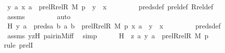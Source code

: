 \begin{isabellebody}
\ {\isachardoublequoteopen}{\isacharless}{\kern0pt}{\isacharless}{\kern0pt}y{\isacharcomma}{\kern0pt}\ a{\isachargreater}{\kern0pt}{\isacharcomma}{\kern0pt}\ {\isacharless}{\kern0pt}x{\isacharcomma}{\kern0pt}\ a{\isachargreater}{\kern0pt}{\isachargreater}{\kern0pt}\ {\isasymin}\ prel{\isacharparenleft}{\kern0pt}Rrel{\isacharparenleft}{\kern0pt}R{\isacharcomma}{\kern0pt}\ M{\isacharparenright}{\kern0pt}{\isacharcomma}{\kern0pt}\ p{\isacharparenright}{\kern0pt}\ {\isasymor}\ y\ {\isacharequal}{\kern0pt}\ x{\isachardoublequoteclose}\ \isanewline
\ \ \ \ \ \ \isamarkupfalse%
\ preds{\isacharunderscore}{\kern0pt}def\ prel{\isacharunderscore}{\kern0pt}def\ Rrel{\isacharunderscore}{\kern0pt}def\isanewline
\ \ \ \ \ \ \isamarkupfalse%
\ assms\ \isanewline
\ \ \ \ \ \ \isamarkupfalse%
\ auto\isanewline
\ \ \ \ \isamarkupfalse%
\ \isamarkupfalse%
\ H{}{\isacharcolon}{\kern0pt}\ {\isachardoublequoteopen}{\isacharless}{\kern0pt}y{\isacharcomma}{\kern0pt}\ a{\isachargreater}{\kern0pt}\ {\isasymin}\ preds{\isacharparenleft}{\kern0pt}{\isasymlambda}a\ b{\isachardot}{\kern0pt}\ {\isasymlangle}a{\isacharcomma}{\kern0pt}\ b{\isasymrangle}\ {\isasymin}\ prel{\isacharparenleft}{\kern0pt}Rrel{\isacharparenleft}{\kern0pt}R{\isacharcomma}{\kern0pt}\ M{\isacharparenright}{\kern0pt}{\isacharcomma}{\kern0pt}\ p{\isacharparenright}{\kern0pt}{\isacharcomma}{\kern0pt}\ {\isasymlangle}x{\isacharcomma}{\kern0pt}\ a{\isasymrangle}{\isacharparenright}{\kern0pt}\ {\isasymor}\ y\ {\isacharequal}{\kern0pt}\ x{\isachardoublequoteclose}\ \isanewline
\ \ \ \ \ \ \isamarkupfalse%
\ preds{\isacharunderscore}{\kern0pt}def\ \isamarkupfalse%
\ assms\ yzH\ pair{\isacharunderscore}{\kern0pt}in{\isacharunderscore}{\kern0pt}M{\isacharunderscore}{\kern0pt}iff\ \isamarkupfalse%
\ simp\isanewline
\isanewline
\ \ \ \ \isamarkupfalse%
\ H{}\ {\isacharcolon}{\kern0pt}\ {\isachardoublequoteopen}{\isacharless}{\kern0pt}{\isacharless}{\kern0pt}z{\isacharcomma}{\kern0pt}\ a{\isachargreater}{\kern0pt}{\isacharcomma}{\kern0pt}\ {\isacharless}{\kern0pt}y{\isacharcomma}{\kern0pt}\ a{\isachargreater}{\kern0pt}{\isachargreater}{\kern0pt}\ {\isasymin}\ prel{\isacharparenleft}{\kern0pt}Rrel{\isacharparenleft}{\kern0pt}R{\isacharcomma}{\kern0pt}\ M{\isacharparenright}{\kern0pt}{\isacharcomma}{\kern0pt}\ p{\isacharparenright}{\kern0pt}{\isachardoublequoteclose}\isanewline
\ \ \ \ \ \ \isamarkupfalse%
{\isacharparenleft}{\kern0pt}rule\ prelI{\isacharparenright}{\kern0pt}\isanewline

\end{isabellebody}
